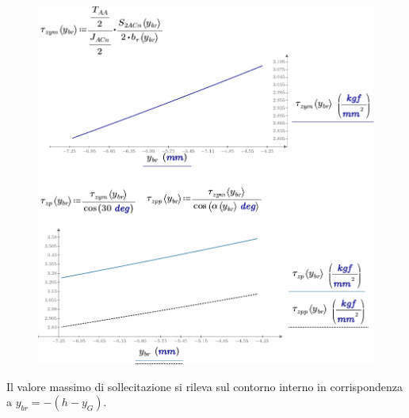 \begin{figure}[H]
\centering
  \includegraphics[width=.75\textwidth]{imgs/MathAsse5_2}
\caption{}
\label{fig:MathAsse5_2}
\end{figure}
Il valore massimo di sollecitazione si rileva sul contorno interno in corrispondenza a $y_{br} = -(h-y_G)$. 

